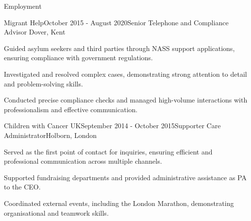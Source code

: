 \documentclass[
	11pt, %
]{resume} %
\begin{document}
\begin{rSection}{Employment}

	\begin{rSubsection}{Migrant Help}{October 2015 - August 2020}{Senior Telephone and Compliance Advisor }{Dover, Kent}
		\item Guided asylum seekers and third parties through NASS support applications, ensuring compliance with government regulations.
		\item Investigated and resolved complex cases, demonstrating strong attention to detail and problem-solving skills.
        \item Conducted precise compliance checks and managed high-volume interactions with professionalism and effective communication.
	\end{rSubsection}


	\begin{rSubsection}{Children with Cancer UK}{September 2014 - October 2015}{Supporter Care Administrator}{Holborn, London}
		\item Served as the first point of contact for inquiries, ensuring efficient and professional communication across multiple channels.
		\item Supported fundraising departments and provided administrative assistance as PA to the CEO.
        \item Coordinated external events, including the London Marathon, demonstrating organisational and teamwork skills.
	\end{rSubsection}
 
\end{rSection}

\end{document}
